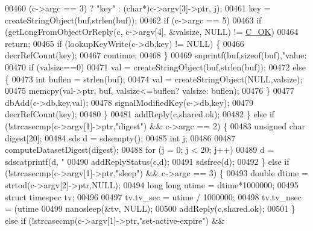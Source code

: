 \begin{DoxyCode}
{{{{{{{{{{{{{{{00460                 (c->argc == 3) ? \textcolor{stringliteral}{"key"} : (\textcolor{keywordtype}{char}*)c->argv[3]->ptr, j);
00461             key = createStringObject(buf,strlen(buf));
00462             \textcolor{keywordflow}{if} (c->argc == 5)
00463                 \textcolor{keywordflow}{if} (getLongFromObjectOrReply(c, c->argv[4], &valsize, NULL) != 
      \hyperlink{server_8h_a303769ef1065076e68731584e758d3e1}{C\_OK})
00464                     \textcolor{keywordflow}{return};
00465             \textcolor{keywordflow}{if} (lookupKeyWrite(c->db,key) != NULL) \{
00466                 decrRefCount(key);
00467                 \textcolor{keywordflow}{continue};
00468             \}
00469             snprintf(buf,\textcolor{keyword}{sizeof}(buf),\textcolor{stringliteral}{"value:%
00470             \textcolor{keywordflow}{if} (valsize==0)
00471                 val = createStringObject(buf,strlen(buf));
00472             \textcolor{keywordflow}{else} \{
00473                 \textcolor{keywordtype}{int} buflen = strlen(buf);
00474                 val = createStringObject(NULL,valsize);
00475                 memcpy(val->ptr, buf, valsize<=buflen? valsize: buflen);
00476             \}
00477             dbAdd(c->db,key,val);
00478             signalModifiedKey(c->db,key);
00479             decrRefCount(key);
00480         \}
00481         addReply(c,shared.ok);
00482     \} \textcolor{keywordflow}{else} \textcolor{keywordflow}{if} (!strcasecmp(c->argv[1]->ptr,\textcolor{stringliteral}{"digest"}) && c->argc == 2) \{
00483         \textcolor{keywordtype}{unsigned} \textcolor{keywordtype}{char} digest[20];
00484         sds d = sdsempty();
00485         \textcolor{keywordtype}{int} j;
00486 
00487         computeDatasetDigest(digest);
00488         \textcolor{keywordflow}{for} (j = 0; j < 20; j++)
00489             d = sdscatprintf(d, \textcolor{stringliteral}{"%
00490         addReplyStatus(c,d);
00491         sdsfree(d);
00492     \} \textcolor{keywordflow}{else} \textcolor{keywordflow}{if} (!strcasecmp(c->argv[1]->ptr,\textcolor{stringliteral}{"sleep"}) && c->argc == 3) \{
00493         \textcolor{keywordtype}{double} dtime = strtod(c->argv[2]->ptr,NULL);
00494         \textcolor{keywordtype}{long} \textcolor{keywordtype}{long} utime = dtime*1000000;
00495         \textcolor{keyword}{struct} timespec tv;
00496 
00497         tv.tv\_sec = utime / 1000000;
00498         tv.tv\_nsec = (utime %
00499         nanosleep(&tv, NULL);
00500         addReply(c,shared.ok);
00501     \} \textcolor{keywordflow}{else} \textcolor{keywordflow}{if} (!strcasecmp(c->argv[1]->ptr,\textcolor{stringliteral}{"set-active-expire"}) &&
}}}}}}}}}}}}}}}}}
\end{DoxyCode}
